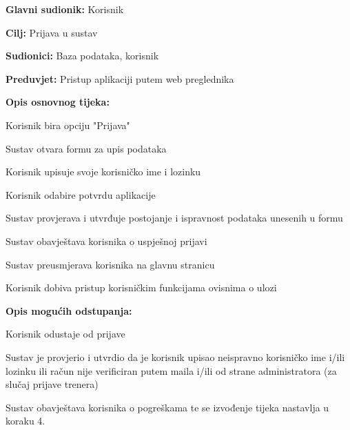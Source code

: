 					\noindent {}
					\begin{packed_item}
	
						\item \textbf{Glavni sudionik: }Korisnik
						\item  \textbf{Cilj:} Prijava u sustav
						\item  \textbf{Sudionici:} Baza podataka, korisnik
						\item  \textbf{Preduvjet:} Pristup aplikaciji putem web preglednika
						\item  \textbf{Opis osnovnog tijeka:}
						
						\item[] \begin{packed_enum}
							\item Korisnik bira opciju "Prijava"  
       					\item Sustav otvara formu za upis podataka
							\item Korisnik upisuje svoje korisničko ime i lozinku
                            \item Korisnik odabire potvrdu aplikacije
							\item Sustav provjerava i utvrđuje postojanje i ispravnost podataka unesenih u formu
                            \item Sustav obavještava korisnika o uspješnoj prijavi
                            \item Sustav preusmjerava korisnika na glavnu stranicu
							\item Korisnik dobiva pristup korisničkim funkcijama ovisnima o ulozi

						\end{packed_enum}
						
						\item  \textbf{Opis mogućih odstupanja:}
						
						\item[] \begin{packed_item}
      					\item[4.a] Korisnik odustaje od prijave
       
						\item[5.a] Sustav je provjerio i utvrdio da je korisnik upisao neispravno korisničko ime i/ili lozinku ili račun nije verificiran putem maila i/ili od strane administratora (za slučaj prijave trenera)
							\item[] \begin{packed_enum}
								
								\item Sustav obavještava korisnika o pogreškama te se izvođenje tijeka nastavlja u koraku 4.					
							\end{packed_enum}
                        \end{packed_item}
                    \end{packed_item}


